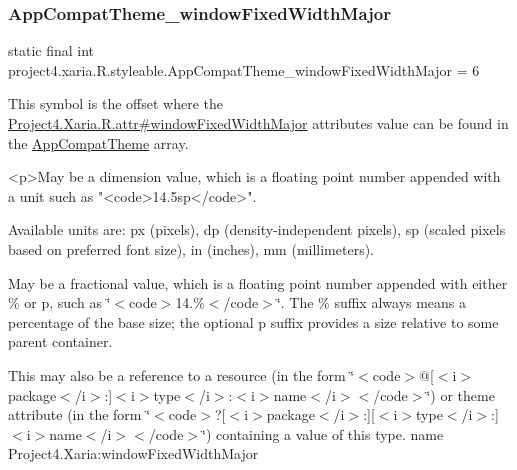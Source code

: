 \subsubsection{\texorpdfstring{App\+Compat\+Theme\+\_\+window\+Fixed\+Width\+Major}{AppCompatTheme\_windowFixedWidthMajor}}
{\footnotesize\ttfamily static final int project4.\+xaria.\+R.\+styleable.\+App\+Compat\+Theme\+\_\+window\+Fixed\+Width\+Major = 6\hspace{0.3cm}{\ttfamily [static]}}

This symbol is the offset where the \hyperlink{}{Project4.\+Xaria.\+R.\+attr\#window\+Fixed\+Width\+Major} attribute\textquotesingle{}s value can be found in the \hyperlink{classproject4_1_1xaria_1_1R_1_1styleable_aad8bec413e2350f9404e6ff0e831a85d}{App\+Compat\+Theme} array.

\begin{DoxyVerb}      <p>May be a dimension value, which is a floating point number appended with a unit such as "<code>14.5sp</code>".
\end{DoxyVerb}
 Available units are\+: px (pixels), dp (density-\/independent pixels), sp (scaled pixels based on preferred font size), in (inches), mm (millimeters). 

May be a fractional value, which is a floating point number appended with either \% or p, such as \char`\"{}$<$code$>$14.\%$<$/code$>$\char`\"{}. The \% suffix always means a percentage of the base size; the optional p suffix provides a size relative to some parent container. 

This may also be a reference to a resource (in the form \char`\"{}$<$code$>$@\mbox{[}$<$i$>$package$<$/i$>$\+:\mbox{]}$<$i$>$type$<$/i$>$\+:$<$i$>$name$<$/i$>$$<$/code$>$\char`\"{}) or theme attribute (in the form \char`\"{}$<$code$>$?\mbox{[}$<$i$>$package$<$/i$>$\+:\mbox{]}\mbox{[}$<$i$>$type$<$/i$>$\+:\mbox{]}$<$i$>$name$<$/i$>$$<$/code$>$\char`\"{}) containing a value of this type.  name Project4.\+Xaria\+:window\+Fixed\+Width\+Major \mbox{\label{classproject4_1_1xaria_1_1R_1_1styleable_afc006d05a67568d40092e9c8b6d65ca5}} 

